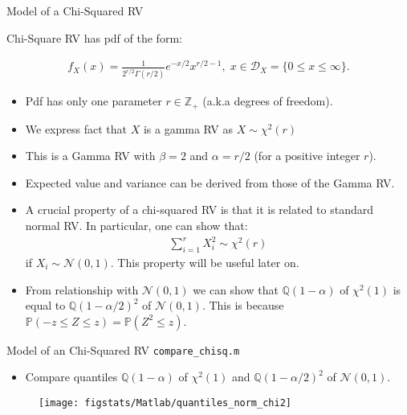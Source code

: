 \documentclass[9pt]{beamer}
\begin{document}
%
\begin{frame}{Model of a Chi-Squared RV}

Chi-Square RV has pdf of the form:
\begin{block}{}
\begin{align*}
f_X(x)=\frac{1}{2^{r/2}\Gamma(r/2)}e^{-x/2}x^{r/2-1},\; x\in \mathcal{D}_X=\{0\leq x\leq \infty\}.
\end{align*}
\end{block}
\begin{itemize}
\setlength{\itemsep}{5pt}
\item Pdf has only one parameter $r\in \mathbb{Z}_+$ (a.k.a degrees of freedom).
\item We express fact that $X$ is a gamma RV as $X\sim \chi^2(r)$
\item This is a Gamma RV with $\beta=2$ and $\alpha=r/2$ (for a positive integer $r$). 
\item Expected value and variance can be derived from those of the Gamma RV.  
\item A crucial property of a chi-squared RV is that it is related to standard normal RV. In particular, one can show that: 
\begin{align*}
\sum_{i=1}^rX_i^2\sim \chi^2(r)
\end{align*}
if $X_i\sim \mathcal{N}(0,1)$. This property will be useful later on. 
\item From relationship with $\mathcal{N}(0,1)$ we can show that $\mathbb{Q}(1-\alpha)$ of $\chi^2(1)$ is equal to $\mathbb{Q}(1-\alpha/2)^2$ of $\mathcal{N}(0,1)$. This is because $\mathbb{P}(-z\leq Z\leq z)=\mathbb{P}(Z^2\leq z)$.  
\end{itemize}

\end{frame}

%
\begin{frame}{Model of an Chi-Squared RV \footnotesize{\texttt{compare\_chisq.m}}}
\begin{itemize}
\item Compare quantiles $\mathbb{Q}(1-\alpha)$ of $\chi^2(1)$ and $\mathbb{Q}(1-\alpha/2)^2$ of $\mathcal{N}(0,1)$.
\end{itemize}
\begin{figure}[!htb]
    \centering
	\texttt{[image: figstats/Matlab/quantiles\_norm\_chi2]}
\end{figure}

\end{frame}
\end{document}
